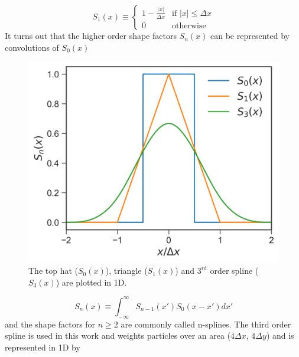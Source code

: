 \begin{equation}
	S_1(x) \equiv \begin{cases}
		1-\frac{\lvert x \rvert}{\Delta x} & \text{if } \lvert x \rvert \leq \Delta x \\
		0 & \text{otherwise}
	\end{cases} \label{eq:triangle}
\end{equation}
It turns out that the higher order shape factors $S_n(x)$ can be represented by convolutions of $S_0(x)$ 

\begin{figure}
	\centering 
	\includegraphics[width=0.6\linewidth]{planning/images/shape_functions.png}
	\caption{The top hat ($S_0(x)$), triangle ($S_1(x)$) and $3^\text{rd}$ order spline ($S_3(x)$) are plotted in 1D.}
	\label{fig:shape_factors}
\end{figure}

\begin{equation}
	S_n(x) \equiv \int_{-\infty}^\infty S_{n-1}(x')S_0(x-x') dx'
\end{equation}
and the shape factors for $n \geq 2$ are commonly called n-splines. The third order spline is used in this work and weights particles over an area ($4 \Delta x$, $4 \Delta y$) and is represented in 1D by 

